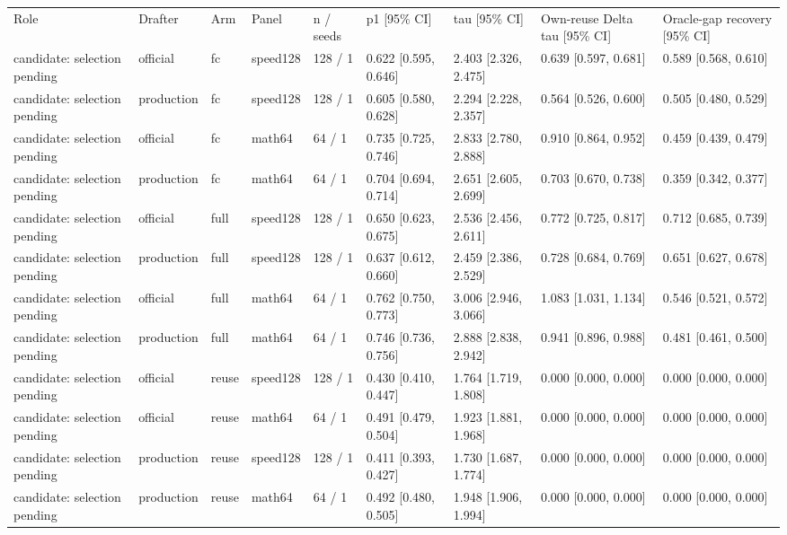 \begin{tabular}{lllllllll}
Role & Drafter & Arm & Panel & n / seeds & p1 [95\% CI] & tau [95\% CI] & Own-reuse Delta tau [95\% CI] & Oracle-gap recovery [95\% CI] \\
candidate: selection pending & official & fc & speed128 & 128 / 1 & 0.622 [0.595, 0.646] & 2.403 [2.326, 2.475] & 0.639 [0.597, 0.681] & 0.589 [0.568, 0.610] \\
candidate: selection pending & production & fc & speed128 & 128 / 1 & 0.605 [0.580, 0.628] & 2.294 [2.228, 2.357] & 0.564 [0.526, 0.600] & 0.505 [0.480, 0.529] \\
candidate: selection pending & official & fc & math64 & 64 / 1 & 0.735 [0.725, 0.746] & 2.833 [2.780, 2.888] & 0.910 [0.864, 0.952] & 0.459 [0.439, 0.479] \\
candidate: selection pending & production & fc & math64 & 64 / 1 & 0.704 [0.694, 0.714] & 2.651 [2.605, 2.699] & 0.703 [0.670, 0.738] & 0.359 [0.342, 0.377] \\
candidate: selection pending & official & full & speed128 & 128 / 1 & 0.650 [0.623, 0.675] & 2.536 [2.456, 2.611] & 0.772 [0.725, 0.817] & 0.712 [0.685, 0.739] \\
candidate: selection pending & production & full & speed128 & 128 / 1 & 0.637 [0.612, 0.660] & 2.459 [2.386, 2.529] & 0.728 [0.684, 0.769] & 0.651 [0.627, 0.678] \\
candidate: selection pending & official & full & math64 & 64 / 1 & 0.762 [0.750, 0.773] & 3.006 [2.946, 3.066] & 1.083 [1.031, 1.134] & 0.546 [0.521, 0.572] \\
candidate: selection pending & production & full & math64 & 64 / 1 & 0.746 [0.736, 0.756] & 2.888 [2.838, 2.942] & 0.941 [0.896, 0.988] & 0.481 [0.461, 0.500] \\
candidate: selection pending & official & reuse & speed128 & 128 / 1 & 0.430 [0.410, 0.447] & 1.764 [1.719, 1.808] & 0.000 [0.000, 0.000] & 0.000 [0.000, 0.000] \\
candidate: selection pending & official & reuse & math64 & 64 / 1 & 0.491 [0.479, 0.504] & 1.923 [1.881, 1.968] & 0.000 [0.000, 0.000] & 0.000 [0.000, 0.000] \\
candidate: selection pending & production & reuse & speed128 & 128 / 1 & 0.411 [0.393, 0.427] & 1.730 [1.687, 1.774] & 0.000 [0.000, 0.000] & 0.000 [0.000, 0.000] \\
candidate: selection pending & production & reuse & math64 & 64 / 1 & 0.492 [0.480, 0.505] & 1.948 [1.906, 1.994] & 0.000 [0.000, 0.000] & 0.000 [0.000, 0.000] \\
\end{tabular}
